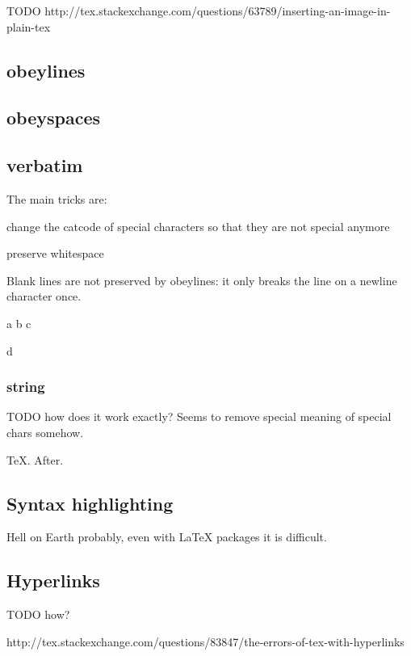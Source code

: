     TODO http://tex.stackexchange.com/questions/63789/inserting-an-image-in-plain-tex

  \subsection{obeylines}

  \subsection{obeyspaces}

  \subsection{verbatim}

    The main tricks are:

    \item{} change the catcode of special characters so that they are not special anymore
    \item{} preserve whitespace

    Blank lines are not preserved by obeylines: it only breaks the line on a newline character once.

    \begingroup
      \obeylines
      \obeyspaces
      a      b
      c


      d
    \endgroup

    \subsubsection{string}

      TODO how does it work exactly? Seems to remove special meaning of special chars somehow.

      {\string \TeX. After.}

  \subsection{Syntax highlighting}

    Hell on Earth probably, even with LaTeX packages it is difficult.

  \subsection{Hyperlinks}

    TODO how?

    http://tex.stackexchange.com/questions/83847/the-errors-of-tex-with-hyperlinks

